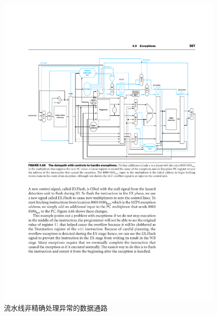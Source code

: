 \documentclass[]{report}
\begin{document}
\begin{figure}[h]
\begin{minipage}{20em}
\begin{minipage}{20em}
					\includegraphics[scale = 0.3]{images/Pipeline_Exceptions_NonExact.pdf}
					\caption{流水线非精确处理异常的数据通路}
				\end{minipage}
			\end{minipage}
			\quad
			\begin{minipage}{20em}
				\centering

\end{minipage}
\end{figure}
\end{document}
